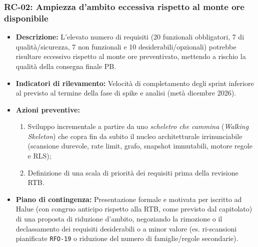 \subsubsection{RC-02: Ampiezza d'ambito eccessiva rispetto al monte ore disponibile}
\begin{itemize}
    \item \textbf{Descrizione:} L'elevato numero di requisiti (20 funzionali obbligatori, 7 di qualità/sicurezza, 7 non funzionali e 10 desiderabili/opzionali) potrebbe risultare eccessivo rispetto al monte ore preventivato, mettendo a rischio la qualità della consegna finale PB.
    \item \textbf{Indicatori di rilevamento:} Velocità di completamento degli sprint inferiore al previsto al termine della fase di spike e analisi (metà dicembre 2026).
    \item \textbf{Azioni preventive:}
    \begin{enumerate}
        \item Sviluppo incrementale a partire da uno \textit{scheletro che cammina} (\textit{Walking Skeleton}) che copra fin da subito il nucleo architetturale irrinunciabile (scansione durevole, rate limit, grafo, snapshot immutabili, motore regole e RLS);
        \item Definizione di una scala di priorità dei requisiti prima della revisione RTB.
    \end{enumerate}
    \item \textbf{Piano di contingenza:} Presentazione formale e motivata per iscritto ad Halue (con congruo anticipo rispetto alla RTB, come previsto dal capitolato) di una proposta di riduzione d'ambito, negoziando la rimozione o il declassamento dei requisiti desiderabili o a minor valore (es. ri-scansioni pianificate \texttt{RFO-19} o riduzione del numero di famiglie/regole secondarie).
\end{itemize}